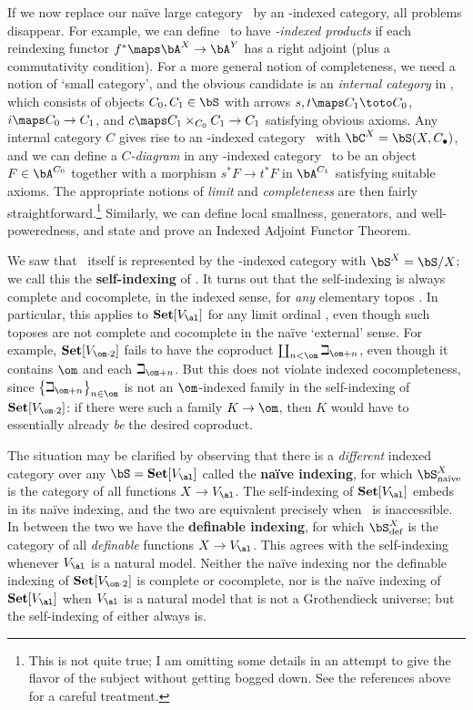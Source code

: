 \documentclass{amsart}
\newcommand{\Set}{\ensuremath{\mathbf{Set}}}
\begin{document}
If we now replace our na\"ive large category \bA\ by an \bS-indexed
category, all problems disappear.  For example, we can define \bA\ to
have \emph{\bS-indexed products} if each reindexing functor $f^*\maps
\bA^X\to\bA^Y$ has a right adjoint (plus a commutativity condition).
For a more general notion of completeness, we need a notion of `small
category', and the obvious candidate is an \emph{internal category} in
\bS, which consists of objects $C_0,C_1\in\bS$ with arrows $s,t\maps
C_1\toto C_0$, $i\maps C_0\to C_1$, and $c\maps C_1\times_{C_0} C_1\to
C_1$ satisfying obvious axioms.  Any internal category $C$ gives rise
to an \bS-indexed category \bC\ with $\bC^X = \bS(X,C_\bullet)$, and
we can define a \emph{$C$-diagram} in any \bS-indexed category \bA\ to
be an object $F\in \bA^{C_0}$ together with a morphism $s^* F\to t^*F$
in $\bA^{C_1}$ satisfying suitable axioms.  The appropriate notions of
\emph{limit} and \emph{completeness} are then fairly
straightforward.\footnote{This is not quite true; I am omitting some
  details in an attempt to give the flavor of the subject without
  getting bogged down.  See the references above for a careful
  treatment.}  Similarly, we can define local smallness, generators,
and well-poweredness, and state and prove an Indexed Adjoint Functor
Theorem.

We saw that \bS\ itself is represented by the \bS-indexed category
with $\bS^X = \bS/X$; we call this the \textbf{self-indexing} of \bS.
It turns out that the self-indexing is always complete and cocomplete,
in the indexed sense, for \emph{any} elementary topos \bS.  In
particular, this applies to $\Set[V_\al]$ for any limit ordinal \al,
even though such toposes are not complete and cocomplete in the
na\"ive `external' sense.  For example, $\Set[V_{\om\cdot 2}]$ fails
to have the coproduct $\coprod_{n<\om}\beth_{\om+n}$, even though it
contains $\om$ and each $\beth_{\om+n}$.  But this does not violate
indexed cocompleteness, since $\big\{\beth_{\om+n}\big\}_{n\in\om}$ is
not an $\om$-indexed family in the self-indexing of $\Set[V_{\om\cdot
  2}]$: if there were such a family $K\to \om$, then $K$ would have to
essentially already \emph{be} the desired coproduct.

The situation may be clarified by observing that there is a
\emph{different} indexed category over any $\bS=\Set[V_\al]$ called
the \textbf{na\"ive indexing}, for which $\bS_{\text{na\"ive}}^X$ is
the category of all functions $X\to V_\al$.  The self-indexing of
$\Set[V_\al]$ embeds in its na\"ive indexing, and the two are
equivalent precisely when \al\ is inaccessible.  In between the two we
have the \textbf{definable indexing}, for which $\bS_{\text{def}}^X$
is the category of all \emph{definable} functions $X\to V_\al$.  This
agrees with the self-indexing whenever $V_\al$ is a natural model.
Neither the na\"ive indexing nor the definable indexing of
$\Set[V_{\om\cdot 2}]$ is complete or cocomplete, nor is the na\"ive
indexing of $\Set[V_\al]$ when $V_\al$ is a natural model that is not
a Grothendieck universe; but the self-indexing of either always is.
\end{document}
